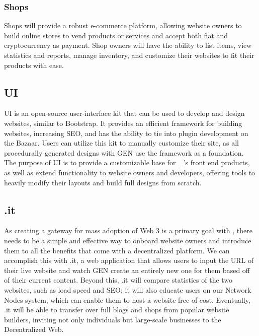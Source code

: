 \documentclass{kwp-builder}
\begin{document}
\subsubsection{\konjure Shops}

\tab \konjure Shops will provide a robust e-commerce platform, allowing website owners to build online stores to vend products or services and accept both fiat and cryptocurrency as payment. Shop owners will have the ability to list items, view statistics and reports, manage inventory, and customize their websites to fit their products with ease.

\subsection{\konjure UI}

\tab \konjure UI is an open-source user-interface kit that can be used to develop and design websites, similar to Bootstrap. It provides an efficient framework for building websites, increasing SEO, and has the ability to tie into plugin development on the Bazaar. Users can utilize this kit to manually customize their \konjure site, as all procedurally generated designs with \konjure GEN use the framework as a foundation. The purpose of \konjure UI is to provide a customizable base for \konjure\_{’}s front end products, as well as extend functionality to website owners and developers, offering tools to heavily modify their layouts and build full designs from scratch.

\subsection{\konjure.it}

\tab As creating a gateway for mass adoption of Web 3 is a primary goal with \konjure, there needs to be a simple and effective way to onboard website owners and introduce them to all the benefits that come with a decentralized platform. We can accomplish this with \konjure.it, a web application that allows users to input the URL of their live website and watch \konjure GEN create an entirely new one for them based off of their current content. Beyond this, \konjure.it will compare statistics of the two websites, such as load speed and SEO; it will also educate users on our Network Nodes system, which can enable them to host a website free of cost. Eventually, \konjure.it will be able to transfer over full blogs and shops from popular website builders, inviting not only individuals but large-scale businesses to the Decentralized Web.
\end{document}
